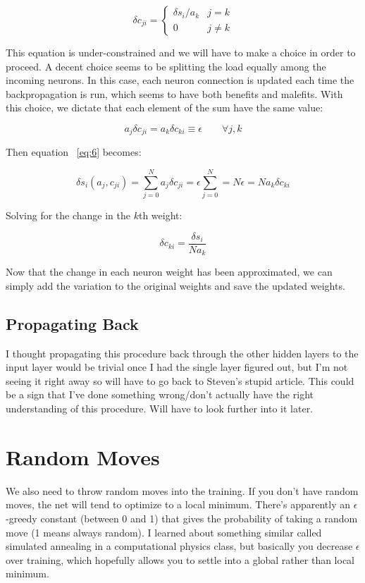 \documentclass{article}[12pt]
\begin{document}
\begin{equation}
    \delta c_{ji} = 
    \begin{cases}
        \delta s_i / a_k & j=k \\
        0 & j \neq k
    \end{cases}
    \label{eq:7}
\end{equation}

This equation is under-constrained and we will have to make a choice in order to proceed. A decent choice seems to be splitting the load equally among the incoming neurons. In this case, each neuron connection is updated each time the backpropagation is run, which seems to have both benefits and malefits. With this choice, we dictate that each element of the sum have the same value:

\begin{equation}
    a_j \delta c_{ji} = a_k \delta c_{ki} \equiv \epsilon \qquad \forall j,k
    \label{eq:8}
\end{equation}

Then equation ~\ref{eq:6} becomes:

\begin{equation}
    \delta s_i(a_j, c_{ji}) = \sum_{j=0}^N a_j \delta c_{ji} = \epsilon \sum_{j=0}^N = N \epsilon = N a_k \delta c_{ki}
    \label{eq:9}
\end{equation}

Solving for the change in the $k$th weight:

\begin{equation}
    \delta c_{ki} = \frac{\delta s_i}{N a_k} 
    \label{eq:10}
\end{equation}

Now that the change in each neuron weight has been approximated, we can simply add the variation to the original weights and save the updated weights.


\subsection{Propagating Back}

I thought propagating this procedure back through the other hidden layers to the input layer would be trivial once I had the single layer figured out, but I'm not seeing it right away so will have to go back to Steven's stupid article. This could be a sign that I've done something wrong/don't actually have the right understanding of this procedure. Will have to look further into it later.


\section{Random Moves}

We also need to throw random moves into the training. If you don't have random moves, the net will tend to optimize to a local minimum. There's apparently an $\epsilon$-greedy constant (between 0 and 1) that gives the probability of taking a random move (1 means always random). I learned about something similar called simulated annealing in a computational physics class, but basically you decrease $\epsilon$ over training, which hopefully allows you to settle into a global rather than local minimum. 
\end{document}
